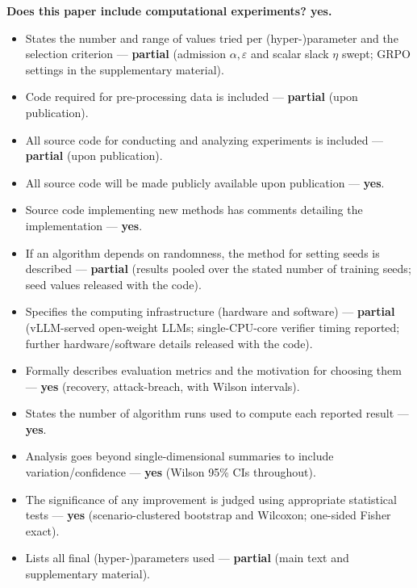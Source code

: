 \documentclass[letterpaper]{article} %
\theoremstyle{plain}
\begin{document}
\noindent\textbf{Does this paper include computational experiments? yes.}
\begin{itemize}\setlength{\itemsep}{0pt}
\item States the number and range of values tried per (hyper-)parameter and the selection criterion --- \textbf{partial} (admission $\alpha,\varepsilon$ and scalar slack $\eta$ swept; GRPO settings in the supplementary material).
\item Code required for pre-processing data is included --- \textbf{partial} (upon publication).
\item All source code for conducting and analyzing experiments is included --- \textbf{partial} (upon publication).
\item All source code will be made publicly available upon publication --- \textbf{yes}.
\item Source code implementing new methods has comments detailing the implementation --- \textbf{yes}.
\item If an algorithm depends on randomness, the method for setting seeds is described --- \textbf{partial} (results pooled over the stated number of training seeds; seed values released with the code).
\item Specifies the computing infrastructure (hardware and software) --- \textbf{partial} (vLLM-served open-weight LLMs; single-CPU-core verifier timing reported; further hardware/software details released with the code).
\item Formally describes evaluation metrics and the motivation for choosing them --- \textbf{yes} (recovery, attack-breach, with Wilson intervals).
\item States the number of algorithm runs used to compute each reported result --- \textbf{yes}.
\item Analysis goes beyond single-dimensional summaries to include variation/confidence --- \textbf{yes} (Wilson 95\% CIs throughout).
\item The significance of any improvement is judged using appropriate statistical tests --- \textbf{yes} (scenario-clustered bootstrap and Wilcoxon; one-sided Fisher exact).
\item Lists all final (hyper-)parameters used --- \textbf{partial} (main text and supplementary material).
\end{itemize}
\end{document}
